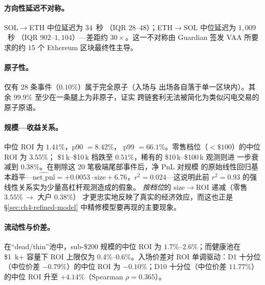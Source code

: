 \documentclass[sigconf,nonacm,10pt]{acmart}
\newcommand{\SolEth}{SOL$\to$ETH}
\newcommand{\EthSol}{ETH$\to$SOL}
\begin{document}
\paragraph{方向性延迟不对称。} \SolEth{} 中位延迟为 $34$~秒
（IQR $28$--$48$）；\EthSol{} 中位延迟为 $1{,}009$~秒
（IQR $902$--$1{,}104$）---差距约 $30\times$。这一不对称由 Guardian
签发 VAA 所要求的约 $15$ 个 Ethereum 区块最终性主导。

\paragraph{原子性。} 仅有 $28$ 条事件（$0.10\%$）属于完全原子（入场与
出场各自落于单一区块内）。其余 $99.9\%$ 至少在一条腿上为非原子，证实
跨链套利无法被简化为类似闪电交易的原子原语。

\paragraph{规模---收益关系。} 中位 ROI 为 $1.41\%$，p90 $=8.42\%$，
p99 $=66.1\%$。零售档位（$<\$100$）的中位 ROI 为 $3.55\%$；
\$1\,k--\$10\,k 档跌至 $0.51\%$，稀有的 \$10\,k--\$100\,k 观测则进
一步衰减到 $0.38\%$。在剔除这 20 笔极端尾部事件后，净 PnL 对规模
的原始线性回归基本趋平---$\widehat{\text{net\_pnl}} =
+0.0053\cdot\text{size} + 6.76$，$r^{2}\!=\!0.024$---这说明此前
$r^{2}\!=\!0.93$ 的强线性关系实为少量高杠杆观测造成的假象。
\emph{按档位}的 size$\to$ROI 递减（零售 $3.55\%\,\to$ 大户 $0.38\%$）
才更忠实地反映了真实的经济效应，而这也正是
\S\ref{sec:ch4-refined-model} 中精修模型要再现的主要现象。

\paragraph{流动性与价差。} 在“dead/thin”池中，sub-\$200 规模的中位
ROI 为 $1.7\%$--$2.6\%$；而健康池在 \$1~k+ 容量下 ROI 上限仅为
$0.4\%$--$0.6\%$。入场价差对 ROI 单调驱动：D1 十分位（中位价差
$-0.79\%$）的中位 ROI 为 $-0.10\%$；D10 十分位（中位价差 $11.77\%$）
的中位 ROI 升至 $+4.14\%$（Spearman $\rho=0.365$）。
\end{document}
